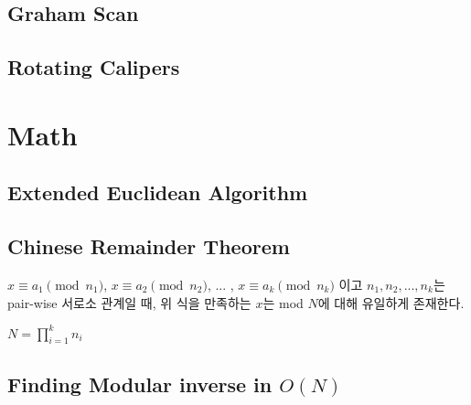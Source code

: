 \documentclass[10pt,landscape,a4paper,twocolumn]{article}
\begin{document}
\subsection{Graham Scan}


\subsection{Rotating Calipers}


\iffalse
\subsection{Plane Sweeping with Segment Tree}
시간복잡도 : $O(N\log{N})$

\fi



\section{Math}
\subsection{Extended Euclidean Algorithm}


\subsection{Chinese Remainder Theorem}
$x \equiv a_1 \pmod{n_1}$, $x \equiv a_2 \pmod{n_2}$, ... , $x \equiv a_k \pmod{n_k}$ 이고 $n_1, n_2, ... , n_k$는 pair-wise 서로소 관계일 때, 위 식을 만족하는 $x$는 mod $N$에 대해 유일하게 존재한다.\\
\begin{large}
$N = \prod_{i=1}^k {n_i}$
\end{large}


\subsection{Finding Modular inverse in $O(N)$}

\end{document}
